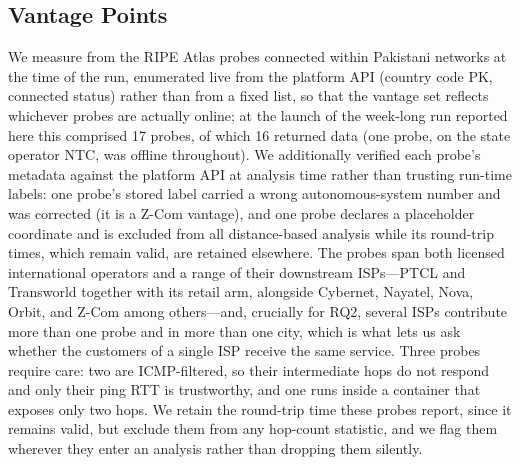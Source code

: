\documentclass[sigconf,anonymous,10pt]{acmart}
\begin{document}
\subsection{Vantage Points}
We measure from the RIPE Atlas probes connected within Pakistani networks at the time of the run,
enumerated live from the platform API (country code PK, connected status) rather than from a fixed
list, so that the vantage set reflects whichever probes are actually online; at the launch of the
week-long run reported here this comprised 17 probes, of which 16 returned data (one probe, on the
state operator NTC, was offline throughout). We additionally verified each probe's metadata against
the platform API at analysis time rather than trusting run-time labels: one probe's stored label
carried a wrong autonomous-system number and was corrected (it is a Z-Com vantage), and one probe
declares a placeholder coordinate and is excluded from all distance-based analysis while its
round-trip times, which remain valid, are retained elsewhere. The probes span both licensed
international operators and a range of their downstream ISPs---PTCL and Transworld together with
its retail arm, alongside Cybernet, Nayatel, Nova, Orbit, and Z-Com among others---and, crucially
for RQ2, several ISPs contribute more than one probe and in more than one city, which is what lets
us ask whether the customers of a single ISP receive the same service. Three probes require care:
two are ICMP-filtered, so their intermediate hops do not respond and only their ping RTT is
trustworthy, and one runs inside a container that exposes only two hops. We retain the round-trip
time these probes report, since it remains valid, but exclude them from any hop-count statistic,
and we flag them wherever they enter an analysis rather than dropping them silently.
\end{document}
